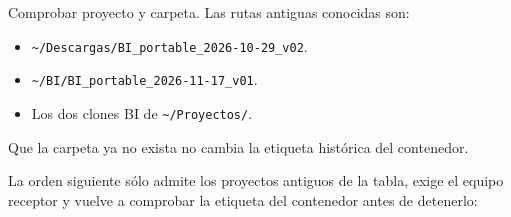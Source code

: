 \documentclass[
  spanish,
  10pt,
  a4paper,
]{article}
\newenvironment{Shaded}{}{}
\newcommand{\AttributeTok}[1]{#1}
\newcommand{\BuiltInTok}[1]{#1}
\newcommand{\ExtensionTok}[1]{#1}
\newcommand{\FunctionTok}[1]{#1}
\newcommand{\KeywordTok}[1]{\textbf{#1}}
\newcommand{\NormalTok}[1]{#1}
\newcommand{\OperatorTok}[1]{#1}
\newcommand{\OtherTok}[1]{#1}
\newcommand{\PreprocessorTok}[1]{\textbf{#1}}
\newcommand{\SpecialStringTok}[1]{#1}
\newcommand{\StringTok}[1]{#1}
\newcommand{\VariableTok}[1]{#1}
\providecommand{\tightlist}{%
  \setlength{\itemsep}{0pt}\setlength{\parskip}{0pt}}
\renewenvironment{Shaded}{\begin{snugshade}}{\end{snugshade}}%
\begin{document}
Comprobar proyecto y carpeta. Las rutas antiguas conocidas son:

\begin{itemize}
\tightlist
\item
  \texttt{\textasciitilde{}/Descargas/BI\_portable\_2026-10-29\_v02}.
\item
  \texttt{\textasciitilde{}/BI/BI\_portable\_2026-11-17\_v01}.
\item
  Los dos clones BI de \texttt{\textasciitilde{}/Proyectos/}.
\end{itemize}

Que la carpeta ya no exista no cambia la etiqueta histórica del
contenedor.

La orden siguiente sólo admite los proyectos antiguos de la tabla, exige
el equipo receptor y vuelve a comprobar la etiqueta del contenedor antes
de detenerlo:

\begin{Shaded}
\end{Shaded}
\end{document}
